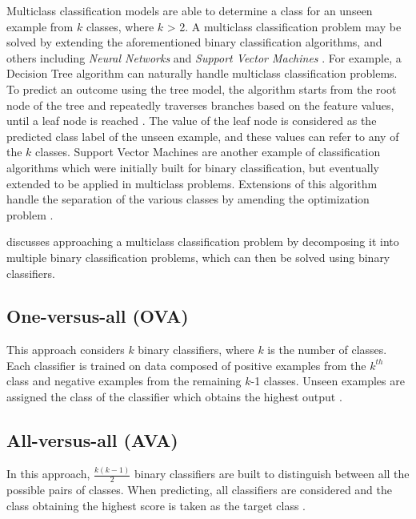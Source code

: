 Multiclass classification models are able to determine a class for an unseen example from $k$ classes, where $k$ > 2. A multiclass classification problem may be solved by extending the aforementioned binary classification algorithms, and others including \textit{Neural Networks} and \textit{Support Vector Machines} \citep{aly2005}. For example, a Decision Tree algorithm can naturally handle multiclass classification problems. To predict an outcome using the tree model, the algorithm starts from the root node of the tree and repeatedly traverses branches based on the feature values, until a leaf node is reached \citep{rokach2014}. The value of the leaf node is considered as the predicted class label of the unseen example, and these values can refer to any of the $k$ classes. Support Vector Machines are another example of classification algorithms which were initially built for binary classification, but eventually extended to be applied in multiclass problems. Extensions of this algorithm handle the separation of the various classes by amending the optimization problem \citep{aly2005}.   

\citet{aly2005} discusses approaching a multiclass classification problem by decomposing it into multiple binary classification problems, which can then be solved using binary classifiers.

\subsection{One-versus-all (OVA)} 
This approach considers $k$ binary classifiers, where $k$ is the number of classes. Each classifier is trained on data composed of positive examples from the $k^{th}$ class and negative examples from the remaining $k$-1 classes. Unseen examples are assigned the class of the classifier which obtains the highest output \citep{aly2005}.

\subsection{All-versus-all (AVA)} 

In this approach, $\frac{k(k-1)}{2}$ binary classifiers are built to distinguish between all the possible pairs of classes. When predicting, all classifiers are considered and the class obtaining the highest score is taken as the target class \citep{aly2005}.


